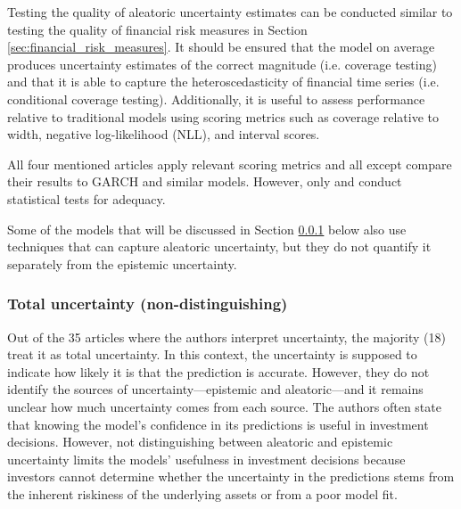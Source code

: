 Testing the quality of aleatoric uncertainty estimates can be conducted similar to testing the quality of financial risk measures in Section \ref{sec:financial_risk_measures}. It should be ensured that the model on average produces uncertainty estimates of the correct magnitude (i.e. coverage testing) and that it is able to capture the heteroscedasticity of financial time series (i.e. conditional coverage testing). Additionally, it is useful to assess performance relative to traditional models using scoring metrics such as coverage relative to width, negative log-likelihood (NLL), and interval scores.

All four mentioned articles apply relevant scoring metrics and all except \textcite{Wang2024GoldForecasting} compare their results to GARCH and similar models. However, only \parencite{arian2022encoded} and \parencite{Horenko2020} conduct statistical tests for adequacy.

Some of the models that will be discussed in Section \ref{sec:total_uncertainty} below also use techniques that can capture aleatoric uncertainty, but they do not quantify it separately from the epistemic uncertainty.


\subsubsection{Total uncertainty (non-distinguishing)}
\label{sec:total_uncertainty}

Out of the 35 articles where the authors interpret uncertainty, the majority (18) treat it as total uncertainty. In this context, the uncertainty is supposed to indicate how likely it is that the prediction is accurate. However, they do not identify the sources of uncertainty—epistemic and aleatoric—and it remains unclear how much uncertainty comes from each source. The authors often state that knowing the model's confidence in its predictions is useful in investment decisions. However, not distinguishing between aleatoric and epistemic uncertainty limits the models' usefulness in investment decisions because investors cannot determine whether the uncertainty in the predictions stems from the inherent riskiness of the underlying assets or from a poor model fit.


